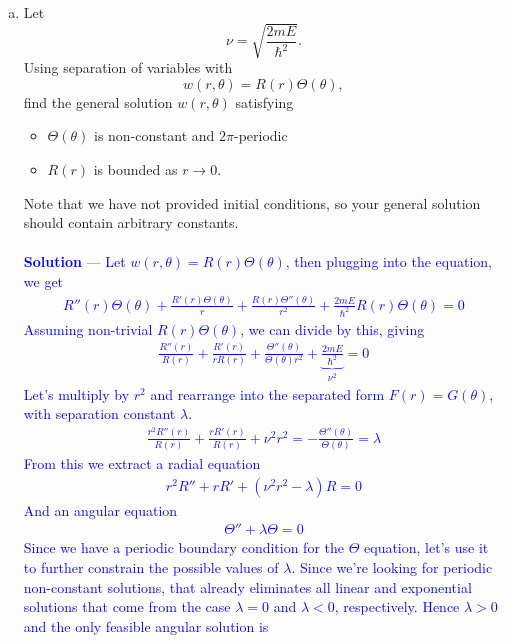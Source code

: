\documentclass[12pt]{article}
\begin{document}
\begin{enumerate}[(a)]
\item Let 
\begin{equation}
\label{nuE}
\nu = \sqrt{\frac{2mE}{\hbar^2}}.
\end{equation}
Using separation of variables with 
$$w(r,\theta) = R(r) \Theta(\theta),$$ find the general solution $w(r,\theta)$ satisfying
\begin{itemize}
\item $\Theta(\theta)$ is non-constant and $2\pi$-periodic
\item $R(r)$ is bounded as $r \to 0$.
\end{itemize}
Note that we have not provided initial conditions, so your general solution should contain arbitrary constants. \\ \\  \textcolor{blue}{\textbf{Solution} — 
Let $w(r,\theta) = R(r) \Theta(\theta)$, then plugging into the equation, we get
\begin{align*}
R''(r) \Theta (\theta) + \frac{R'(r) \Theta (\theta)}{r} + \frac{R(r) \Theta''(\theta)}{r^2} + \frac{2mE}{\hbar^2} R(r) \Theta(\theta) = 0
\end{align*}
Assuming non-trivial $R(r) \Theta(\theta)$, we can divide by this, giving
\begin{align*}
\frac{R''(r)}{R(r)} + \frac{R'(r)}{rR(r)} + \frac{\Theta''(\theta)}{\Theta(\theta)r^2} + \underbrace{\frac{2mE}{\hbar^2}}_{\nu^2}  = 0
\end{align*}
Let's multiply by $r^2$ and rearrange into the separated form $F(r) = G(\theta)$, with separation constant $\lambda$.
\begin{align*}
\frac{r^2 R''(r)}{R(r)} + \frac{rR'(r)}{R(r)} + \nu^2 r^2 = -\frac{\Theta''(\theta)}{\Theta(\theta)} = \lambda
\end{align*}
From this we extract a radial equation
\begin{align*}
r^2 R'' + rR' + \left( \nu^2 r^2 -\lambda \right)R = 0
\end{align*}
And an angular equation
\begin{align*}
\Theta'' + \lambda \Theta = 0
\end{align*}
Since we have a periodic boundary condition for the $\Theta$ equation, let's use it to further constrain the possible values of $\lambda$. Since we're looking for periodic non-constant solutions, that already eliminates all linear and exponential solutions that come from the case $\lambda = 0$ and $\lambda < 0$, respectively. Hence $\lambda > 0$ and the only feasible angular solution is \\
}
\end{enumerate}
\end{document}
